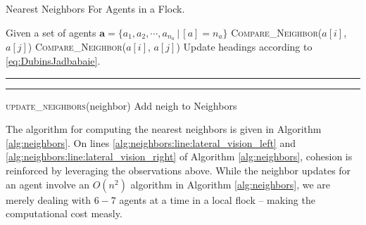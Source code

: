 \begin{algorithm}[tb!]
	\caption{Nearest Neighbors For Agents in a Flock.
		\label{alg:neighbors}}
	\begin{algorithmic}[1]
		\State Given a set of agents $\bm{a} = \{a_1, a_2, \cdots, a_{n_a} \,| \,[a] = n_a\}$ 
		\label{alg:neighbors:line:lateral_vision_left}
		\State \textsc{Compare\_Neighbor($a[i]$, $a[j]$)}
		\EndFor
		\label{alg:neighbors:line:lateral_vision_right}
		\State \textsc{Compare\_Neighbor($a[i]$, $a[j]$)}
		\EndFor
		\EndFor
		\State Update headings according to \eqref{eq:DubinsJadbabaie}.
		\EndFor 
		\EndFunction
	\end{algorithmic}
	\hrule
	\begin{algorithmic}[1]
		\EndIf
		\EndFunction
	\end{algorithmic}
	\hrule
	\begin{algorithmic}[1]
		\State {}
		\State \textsc{\textsf{update\_neighbors}}(\textup{neighbor})
		\EndFor 
		\EndIf
		\State Add \textup{\textsf{neigh}} to \textsf{Neighbors}
		\EndFunction
		\EndProcedure
	\end{algorithmic}
\end{algorithm}
%
The algorithm for computing the nearest neighbors is given in Algorithm \autoref{alg:neighbors}. On lines \autoref{alg:neighbors:line:lateral_vision_left} and \autoref{alg:neighbors:line:lateral_vision_right} of Algorithm \autoref{alg:neighbors}, cohesion is reinforced by leveraging the observations above. While the neighbor updates for an agent involve an $O(n^2)$ algorithm in Algorithm \ref{alg:neighbors}, we are merely dealing with $6-7$ agents at a time in a local flock -- making the computational cost measly.

